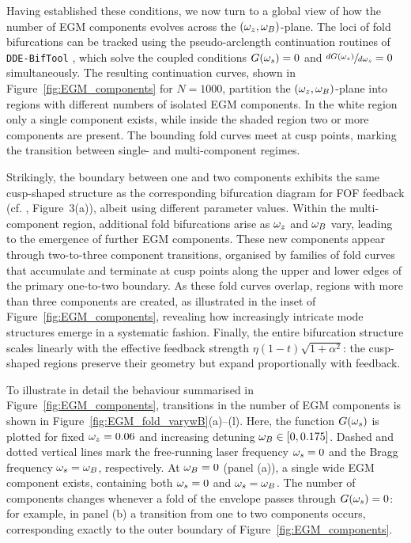 %
\par
%
Having established these conditions, we now turn to a global view of how the number of EGM components evolves across the $(\omega_z,\omega_B)$-plane. 
The loci of fold bifurcations can be tracked using the pseudo-arclength continuation routines of \texttt{DDE-BifTool} \cite{sieber2014dde}, which solve the coupled conditions $G(\omega_s)=0$ and $\sfrac{dG(\omega_s)}{d\omega_s}=0$ simultaneously. 
The resulting continuation curves, shown in Figure~\ref{fig:EGM_components} for $N=1000$, partition the $(\omega_z,\omega_B)$-plane into regions with different numbers of isolated EGM components. 
In the white region only a single component exists, while inside the shaded region two or more components are present. 
The bounding fold curves meet at cusp points, marking the transition between single- and multi-component regimes.
%
\par
%
Strikingly, the boundary between one and two components exhibits the same cusp-shaped structure as the corresponding bifurcation diagram for FOF feedback (cf. \cite{green2006mode}, Figure~3(a)), albeit using different parameter values. 
Within the multi-component region, additional fold bifurcations arise as $\omega_z$ and $\omega_B$ vary, leading to the emergence of further EGM components. 
These new components appear through two-to-three component transitions, organised by families of fold curves that accumulate and terminate at cusp points along the upper and lower edges of the primary one-to-two boundary. 
As these fold curves overlap, regions with more than three components are created, as illustrated in the inset of Figure~\ref{fig:EGM_components}, revealing how increasingly intricate mode structures emerge in a systematic fashion. 
Finally, the entire bifurcation structure scales linearly with the effective feedback strength $\eta (1-t)\sqrt{1+\alpha^2}$: the cusp-shaped regions preserve their geometry but expand proportionally with feedback.
%
\par
%
To illustrate in detail the behaviour summarised in Figure~\ref{fig:EGM_components}, transitions in the number of EGM components is shown in Figure~\ref{fig:EGM_fold_varywB}(a)--(l). 
Here, the function $G(\omega_s)$ is plotted for fixed $\omega_z=0.06$ and increasing detuning $\omega_B \in [0,0.175]$. 
Dashed and dotted vertical lines mark the free-running laser frequency $\omega_s=0$ and the Bragg frequency $\omega_s=\omega_B$, respectively. 
At $\omega_B=0$ (panel (a)), a single wide EGM component exists, containing both $\omega_s=0$ and $\omega_s=\omega_B$. 
The number of components changes whenever a fold of the envelope passes through $G(\omega_s)=0$: for example, in panel (b) a transition from one to two components occurs, corresponding exactly to the outer boundary of Figure~\ref{fig:EGM_components}. 

